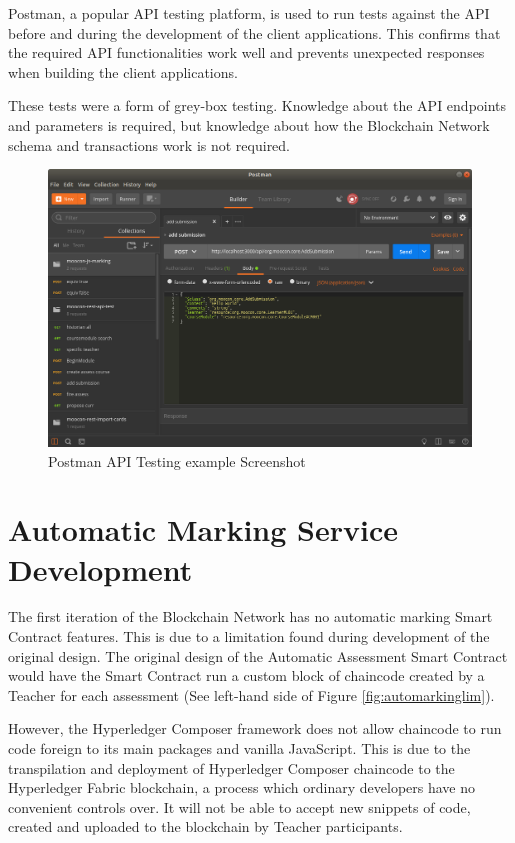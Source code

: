 Postman, a popular API testing platform, is used to run tests against the API 
before and during the development of the client applications. 
This confirms that the required API functionalities work well and 
prevents unexpected responses when building the client applications.

These tests were a form of grey-box testing. Knowledge about the API endpoints 
and parameters is required, but knowledge about how the Blockchain Network schema
and transactions work is not required. 

\clearpage
\begin{figure}[!ht]
	\centering
	\includegraphics[width=1.0\textwidth]{postman}
	\caption[Postman API Testing example Screenshot]
	{Postman API Testing example Screenshot}
	\label{fig:postman}
\end{figure}

\section{Automatic Marking Service Development}

The first iteration of the Blockchain Network has no automatic marking Smart Contract features.
This is due to a limitation found during development of the original design. The original design
of the Automatic Assessment Smart Contract would have the Smart Contract run a custom block of chaincode
created by a Teacher for each assessment (See left-hand side of Figure \ref{fig:automarkinglim}).

However, the Hyperledger Composer framework does not allow chaincode to run code foreign to its main packages and vanilla JavaScript.
This is due to the transpilation and deployment of Hyperledger Composer chaincode to the Hyperledger Fabric blockchain,
a process which ordinary developers have no convenient controls over. It will not be able to accept new snippets of code,
created and uploaded to the blockchain by Teacher participants.

